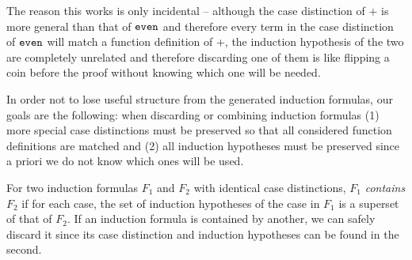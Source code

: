 The reason this works is only incidental -- although the case distinction of $+$ is more general than that of $\mathtt{even}$ and therefore every term in the case distinction of $\mathtt{even}$ will match a function definition of +, the induction hypothesis of the two are completely unrelated and therefore discarding one of them is like flipping a coin before the proof without knowing which one will be needed.

In order not to lose useful structure from the generated induction formulas, our goals are the following: when discarding or combining induction formulas (1) more special case distinctions must be preserved so that all considered function definitions are matched and (2) all induction hypotheses must be preserved since a priori we do not know which ones will be used.

For two induction formulas $F_1$ and $F_2$ with identical case distinctions, $F_1$ \textit{contains} $F_2$ if for each case, the set of induction hypotheses of the case in $F_1$ is a superset of that of $F_2$. If an induction formula is contained by another, we can safely discard it since its case distinction and induction hypotheses can be found in the second.
\begin{example}
\end{example}

